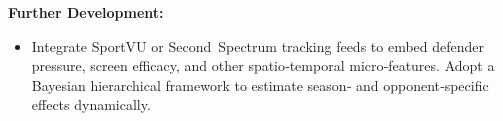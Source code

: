 \documentclass[a4paper, 12pt]{article}
\begin{document}
\textbf{Further Development:}

\begin{itemize}
\item Integrate SportVU or Second~Spectrum tracking feeds to embed defender pressure, screen efficacy, and other spatio‑temporal 
micro‑features. Adopt a Bayesian hierarchical framework to estimate season‑ and opponent‑specific effects dynamically.  
\end{itemize}
\end{document}
